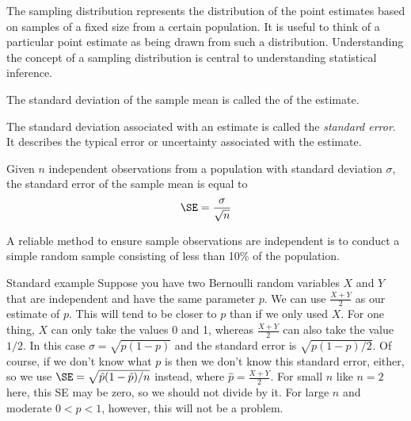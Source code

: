 \begin{termBox}{
The sampling distribution represents the distribution of the point estimates based on samples of a fixed size from a certain population. It is useful to think of a particular point estimate as being drawn from such a distribution. Understanding the concept of a sampling distribution is central to understanding statistical inference.}
\end{termBox}

The standard deviation of the sample mean is called the  of the estimate.

\begin{termBox}{
The standard deviation associated with an estimate is called the \emph{standard error}. It describes the typical error or uncertainty associated with the estimate.}
\end{termBox}




\begin{termBox}{
Given $n$ independent observations from a population with standard deviation $\sigma$, the standard error of the sample mean is equal to \vspace{-1mm}
\begin{eqnarray}
\SE = \frac{\sigma}{\sqrt{n}}
\label{seOfXBar}
\end{eqnarray}\vspace{-3mm}%

A reliable method to ensure sample observations are independent is to conduct a simple random sample consisting of less than 10\% of the population.
}
\end{termBox}


\begin{example}{Standard example}%
Suppose you have two Bernoulli random variables $X$ and $Y$ that are independent and have the same parameter $p$.
We can use $\frac{X+Y}2$ as our estimate of $p$. This will tend to be closer to $p$ than if we only used $X$. For one thing, $X$ can only take the values 0 and 1,
whereas $\frac{X+Y}2$ can also take the value $1/2$. In this case $\sigma=\sqrt{p(1-p)}$ and the standard error is $\sqrt{p(1-p)/2}$.
Of course, if we don't know what $p$ is then we don't know this standard error, either, so we use $\SE=\sqrt{\hat p(1-\hat p)/n}$ instead, where $\hat p =\frac{X+Y}2$.
For small $n$ like $n=2$ here, this SE may be zero, so we should not divide by it. For large $n$ and moderate $0<p<1$, however, this will not be a problem.
\end{example}




